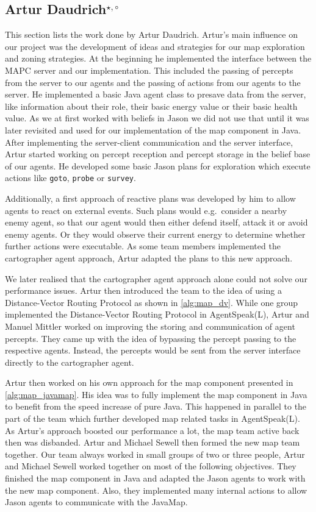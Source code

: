 \subsection[Artur Daudrich]{Artur Daudrich$^{\star,\circ}$}
This section lists the work done by Artur Daudrich.
Artur's main influence on our project was the development of ideas and strategies for our map exploration and zoning strategies.
At the beginning he implemented the interface between the MAPC server and our implementation.
This included the passing of percepts from the server to our agents and the passing of actions from our agents to the server.
He implemented a basic Java agent class to presave data from the server, like information about their role, their basic energy value or their basic health value. 
As we at first worked with beliefs in Jason we did not use that until it was later revisited and used for our implementation of the map component in Java.
After implementing the server-client communication and the server interface, Artur started working on percept reception and percept storage in the belief base of our agents.
He developed some basic Jason plans for exploration which execute actions like \texttt{goto}, \texttt{probe} or \texttt{survey}.

Additionally, a first approach of reactive plans was developed by him to allow agents to react on external events.
Such plans would e.g.\ consider a nearby enemy agent, so that our agent would then either defend itself, attack it or avoid enemy agents.
Or they would observe their current energy to determine whether further actions were executable.
As some team members implemented the cartographer agent approach, Artur adapted the plans to this new approach.

We later realised that the cartographer agent approach alone could not solve our performance issues.
Artur then introduced the team to the idea of using a Distance-Vector Routing Protocol as shown in \autoref{alg:map_dv}.
While one group implemented the Distance-Vector Routing Protocol in AgentSpeak(L), Artur and Manuel Mittler worked on improving the storing and communication of agent percepts.
They came up with the idea of bypassing the percept passing to the respective agents.
Instead, the percepts would be sent from the server interface directly to the cartographer agent.

Artur then worked on his own approach for the map component presented in \autoref{alg:map_javamap}.
His idea was to fully implement the map component in Java to benefit from the speed increase of pure Java.
This happened in parallel to the part of the team which further developed map related tasks in AgentSpeak(L).
As Artur's approach boosted our performance a lot, the map team active back then was disbanded.
Artur and Michael Sewell then formed the new map team together.
Our team always worked in small groups of two or three people, Artur and Michael Sewell worked together on most of the following objectives.
They finished the map component in Java and adapted the Jason agents to work with the new map component.
Also, they implemented many internal actions to allow Jason agents to communicate with the JavaMap.

